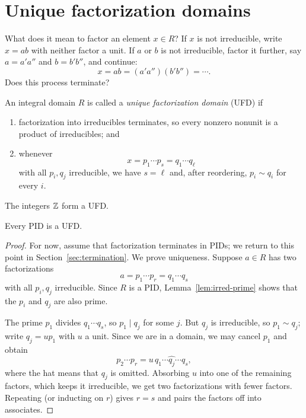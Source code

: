 \documentclass[reqno,11pt]{amsart}
\begin{document}
\section{Unique factorization domains}

What does it mean to factor an element $x\in R$? If $x$ is not
irreducible, write $x=ab$ with neither factor a unit. If $a$ or $b$
is not irreducible, factor it further, say $a=a'a''$ and $b=b'b''$,
and continue:
\[
  x=ab=(a'a'')(b'b'')=\cdots.
\]
Does this process terminate?

\begin{define}
An integral domain $R$ is called a \emph{unique factorization
domain} (UFD) if
\begin{enumerate}[label=(\arabic*)]
  \item factorization into irreducibles terminates, so every nonzero
  nonunit is a product of irreducibles; and
  \item whenever
  \[
    x=p_1\cdots p_s=q_1\cdots q_\ell
  \]
  with all $p_i,q_j$ irreducible, we have $s=\ell$ and, after
  reordering, $p_i\sim q_i$ for every $i$.
\end{enumerate}
\end{define}

\begin{example}
The integers $\mathbb{Z}$ form a UFD.
\end{example}

\begin{proposition}\label{prop:pid-ufd}
Every PID is a UFD.
\end{proposition}
\begin{proof}
For now, assume that factorization terminates in PIDs; we return
to this point in Section~\ref{sec:termination}. We prove uniqueness.
Suppose $a\in R$ has two factorizations
\[
  a=p_1\cdots p_r=q_1\cdots q_s
\]
with all $p_i,q_j$ irreducible. Since $R$ is a PID,
Lemma~\ref{lem:irred-prime} shows that the $p_i$ and $q_j$ are also
prime.

The prime $p_1$ divides $q_1\cdots q_s$, so $p_1\mid q_j$ for some
$j$. But $q_j$ is irreducible, so $p_1\sim q_j$; write $q_j=up_1$
with $u$ a unit. Since we are in a domain, we may cancel $p_1$ and
obtain
\[
  p_2\cdots p_r=u\,q_1\cdots\widehat{q_j}\cdots q_s,
\]
where the hat means that $q_j$ is omitted. Absorbing $u$ into one
of the remaining factors, which keeps it irreducible, we get two
factorizations with fewer factors. Repeating (or inducting on $r$)
gives $r=s$ and pairs the factors off into associates.
\end{proof}
\end{document}

